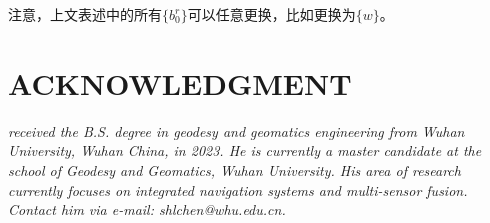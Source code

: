 \documentclass[12pt, onecolumn]{article}
\begin{document}
	注意，上文表述中的所有$\{b^r_0\}$可以任意更换，比如更换为$\{w\}$。

	
	\newpage
	
	
		
	\newpage
	\section*{ACKNOWLEDGMENT}
	\begin{tcolorbox}[colback=white,colframe=white!70!black,title={\bfseries Author Information}]
	\par\noindent
		\parbox[t]{\linewidth}{
	 \noindent{}
	 \emph{
	 received the B.S. degree in geodesy and geomatics engineering from Wuhan University, Wuhan China, in 2023.
	 He is currently a master candidate at the school of Geodesy and Geomatics, Wuhan University. His area of research currently focuses on integrated navigation systems and multi-sensor fusion.
	 Contact him via e-mail: shlchen@whu.edu.cn.
	 }}
	\end{tcolorbox}
		
		
\end{document}
